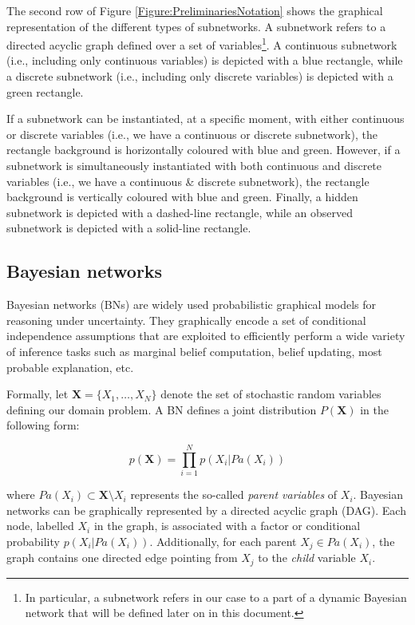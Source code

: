 The second row of Figure \ref{Figure:PreliminariesNotation} shows the graphical representation of the different types of subnetworks. A subnetwork refers to a directed acyclic graph defined over a set of variables\footnote{In particular, a subnetwork refers in our case to a part of a dynamic Bayesian network that will be defined later on in this document.}. A continuous subnetwork (i.e., including only continuous variables) is depicted with a blue rectangle, while a discrete subnetwork (i.e., including only discrete variables) is depicted with a green rectangle. 

If a subnetwork can be instantiated, at a specific moment, with either continuous or discrete variables (i.e., we have a continuous or discrete subnetwork), the rectangle background is horizontally coloured with blue and green. However, if a subnetwork is simultaneously instantiated with both continuous and discrete variables (i.e., we have a continuous \& discrete subnetwork), the rectangle background is vertically coloured with blue and green. Finally, a hidden subnetwork is depicted with a dashed-line rectangle, while an observed subnetwork is depicted with a solid-line rectangle.


\subsection{Bayesian networks}\label{SubSection:HybridBNs}

Bayesian networks (BNs) \cite{JensenNielsen2007} are widely used probabilistic graphical models for reasoning under uncertainty. They graphically encode a set of conditional independence assumptions that are exploited to efficiently perform a wide variety of inference tasks such as marginal belief computation, belief updating, most probable explanation, etc.  

Formally, let $\bm X = \{X_1,\ldots,X_N\}$ denote the set of stochastic random variables defining our domain problem. A BN defines a joint distribution $P(\bm X)$ in the following form:

$$ p(\bm X) = \prod_{i=1}^N p(X_i|Pa(X_i))$$ 

\noindent where $Pa(X_i)\subset \bm X\setminus X_i$ represents the so-called \emph{parent variables} of $X_i$. Bayesian networks can be graphically represented by a directed acyclic graph (DAG). Each node, labelled $X_i$ in the graph, is associated with a factor or conditional probability $p(X_i|Pa(X_i))$. Additionally, for each parent $X_j \in Pa(X_i)$, the graph contains one directed edge pointing from $X_j$ to the \emph{child} variable $X_i$.

